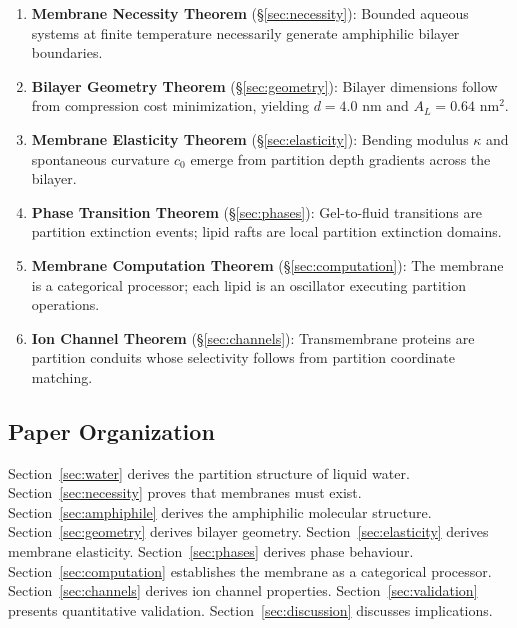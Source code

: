 \documentclass[twocolumn,10pt]{article}
\theoremstyle{remark}
\begin{document}
\begin{enumerate}
    \item \textbf{Membrane Necessity Theorem} (\S\ref{sec:necessity}): Bounded aqueous systems at finite temperature necessarily generate amphiphilic bilayer boundaries.

    \item \textbf{Bilayer Geometry Theorem} (\S\ref{sec:geometry}): Bilayer dimensions follow from compression cost minimization, yielding $d = 4.0$ nm and $A_L = 0.64$ nm$^2$.

    \item \textbf{Membrane Elasticity Theorem} (\S\ref{sec:elasticity}): Bending modulus $\kappa$ and spontaneous curvature $c_0$ emerge from partition depth gradients across the bilayer.

    \item \textbf{Phase Transition Theorem} (\S\ref{sec:phases}): Gel-to-fluid transitions are partition extinction events; lipid rafts are local partition extinction domains.

    \item \textbf{Membrane Computation Theorem} (\S\ref{sec:computation}): The membrane is a categorical processor; each lipid is an oscillator executing partition operations.

    \item \textbf{Ion Channel Theorem} (\S\ref{sec:channels}): Transmembrane proteins are partition conduits whose selectivity follows from partition coordinate matching.
\end{enumerate}

\subsection{Paper Organization}

Section~\ref{sec:water} derives the partition structure of liquid water. Section~\ref{sec:necessity} proves that membranes must exist. Section~\ref{sec:amphiphile} derives the amphiphilic molecular structure. Section~\ref{sec:geometry} derives bilayer geometry. Section~\ref{sec:elasticity} derives membrane elasticity. Section~\ref{sec:phases} derives phase behaviour. Section~\ref{sec:computation} establishes the membrane as a categorical processor. Section~\ref{sec:channels} derives ion channel properties. Section~\ref{sec:validation} presents quantitative validation. Section~\ref{sec:discussion} discusses implications.

\end{document}
